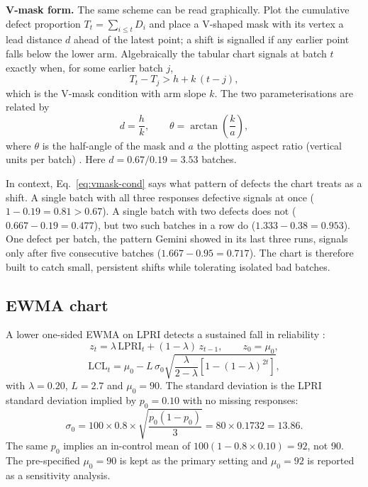 \documentclass[11pt]{article}
\newcommand{\LPRI}{\mathrm{LPRI}}
\newcommand{\LCL}{\mathrm{LCL}}
\begin{document}
\textbf{V-mask form.} The same scheme can be read graphically. Plot the cumulative defect proportion $T_t=\sum_{i\le t}D_i$ and place a V-shaped mask with its vertex a lead distance $d$ ahead of the latest point; a shift is signalled if any earlier point falls below the lower arm. Algebraically the tabular chart signals at batch $t$ exactly when, for some earlier batch $j$,
\begin{equation}
T_t-T_j>h+k\,(t-j),
\label{eq:vmask-cond}
\end{equation}
which is the V-mask condition with arm slope $k$. The two parameterisations are related by
\begin{equation}
d=\frac{h}{k},\qquad \theta=\arctan\!\left(\frac{k}{a}\right),
\label{eq:vmask}
\end{equation}
where $\theta$ is the half-angle of the mask and $a$ the plotting aspect ratio (vertical units per batch) \citep{nist}. Here $d=0.67/0.19=3.53$ batches.

In context, Eq.~\ref{eq:vmask-cond} says what pattern of defects the chart treats as a shift. A single batch with all three responses defective signals at once ($1-0.19=0.81>0.67$). A single batch with two defects does not ($0.667-0.19=0.477$), but two such batches in a row do ($1.333-0.38=0.953$). One defect per batch, the pattern Gemini showed in its last three runs, signals only after five consecutive batches ($1.667-0.95=0.717$). The chart is therefore built to catch small, persistent shifts while tolerating isolated bad batches.

\subsection{EWMA chart}
A lower one-sided EWMA on LPRI detects a sustained fall in reliability \citep{roberts1959,lucas1990}:
\begin{equation}
z_t=\lambda\,\LPRI_t+(1-\lambda)\,z_{t-1},\qquad z_0=\mu_0,
\label{eq:ewma}
\end{equation}
\begin{equation}
\LCL_t=\mu_0-L\,\sigma_0\sqrt{\frac{\lambda}{2-\lambda}\left[1-(1-\lambda)^{2t}\right]},
\label{eq:lcl}
\end{equation}
with $\lambda=0.20$, $L=2.7$ and $\mu_0=90$. The standard deviation is the LPRI standard deviation implied by $p_0=0.10$ with no missing responses:
\begin{equation}
\sigma_0=100\times0.8\times\sqrt{\frac{p_0(1-p_0)}{3}}=80\times0.1732=13.86.
\label{eq:sigma}
\end{equation}
The same $p_0$ implies an in-control mean of $100(1-0.8\times0.10)=92$, not 90. The pre-specified $\mu_0=90$ is kept as the primary setting and $\mu_0=92$ is reported as a sensitivity analysis.
\end{document}

